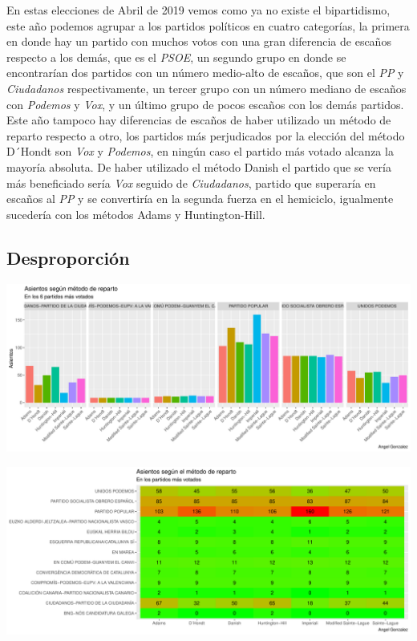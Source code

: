 \documentclass[12pt,a4paper,]{book}
\numberwithin{dummy}{section}
\theoremstyle{ocrenumbox}
\theoremstyle{blacknumex}
\theoremstyle{blacknumbox}
\theoremstyle{ocrenum}
\theoremstyle{ocrenum}
\begin{document}
En estas elecciones de Abril de 2019 vemos como ya no existe el
bipartidismo, este año podemos agrupar a los partidos políticos en
cuatro categorías, la primera en donde hay un partido con muchos votos
con una gran diferencia de escaños respecto a los demás, que es el
\emph{PSOE}, un segundo grupo en donde se encontrarían dos partidos con
un número medio-alto de escaños, que son el \emph{PP} y
\emph{Ciudadanos} respectivamente, un tercer grupo con un número mediano
de escaños con \emph{Podemos} y \emph{Vox}, y un último grupo de pocos
escaños con los demás partidos. Este año tampoco hay diferencias de
escaños de haber utilizado un método de reparto respecto a otro, los
partidos más perjudicados por la elección del método D´Hondt son
\emph{Vox} y \emph{Podemos}, en ningún caso el partido más votado
alcanza la mayoría absoluta. De haber utilizado el método Danish el
partido que se vería más beneficiado sería \emph{Vox} seguido de
\emph{Ciudadanos}, partido que superaría en escaños al \emph{PP} y se
convertiría en la segunda fuerza en el hemiciclo, igualmente sucedería
con los métodos Adams y Huntington-Hill.

\hypertarget{desproporciuxf3n-13}{%
\subsection{Desproporción}\label{desproporciuxf3n-13}}

\begin{center}\includegraphics[width=1\linewidth]{figurasR/unnamed-chunk-118-1} \end{center}

\begin{center}\includegraphics[width=1\linewidth]{figurasR/unnamed-chunk-118-2} \end{center}
\end{document}
